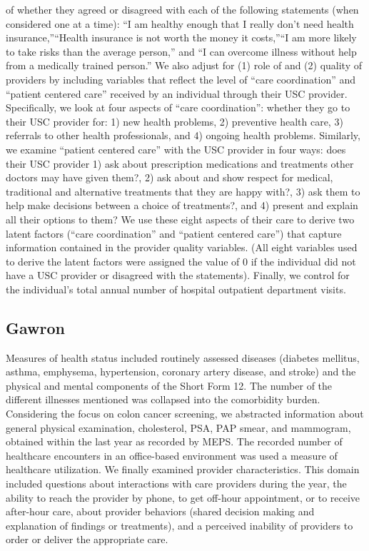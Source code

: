\documentclass[../main.tex]{subfiles}
\begin{document}
of whether they agreed or disagreed with each of the following statements (when considered one at a time): “I am healthy enough that I really don't need health insurance,”“Health insurance is not worth the money it costs,”“I am more likely to take risks than the average person,” and “I can overcome illness without help from a medically trained person.” We also adjust for (1) role of and (2) quality of providers by including variables that reflect the level of “care coordination” and “patient centered care” received by an individual through their USC provider. Specifically, we look at four aspects of “care coordination”: whether they go to their USC provider for: 1) new health problems, 2) preventive health care, 3) referrals to other health professionals, and 4) ongoing health problems. Similarly, we examine “patient centered care” with the USC provider in four ways: does their USC provider 1) ask about prescription medications and treatments other doctors may have given them?, 2) ask about and show respect for medical, traditional and alternative treatments that they are happy with?, 3) ask them to help make decisions between a choice of treatments?, and 4) present and explain all their options to them? We use these eight aspects of their care to derive two latent factors (“care coordination” and “patient centered care”) that capture information contained in the provider quality variables. (All eight variables used to derive the latent factors were assigned the value of 0 if the individual did not have a USC provider or disagreed with the statements). Finally, we control for the individual's total annual number of hospital outpatient department visits.


\subsection{Gawron}

Measures of health status included routinely assessed diseases (diabetes mellitus, asthma, emphysema, hypertension, coronary artery disease, and stroke) and the physical and mental components of the Short Form 12. The number of the different illnesses mentioned was collapsed into the comorbidity burden. Considering the focus on colon cancer screening, we abstracted information about general physical examination, cholesterol, PSA, PAP smear, and mammogram, obtained within the last year as recorded by MEPS. The recorded number of healthcare encounters in an office-based environment was used a measure of healthcare utilization. We finally examined provider characteristics. This domain included questions about interactions with care providers during the year, the ability to reach the provider by phone, to get off-hour appointment, or to receive after-hour care, about provider behaviors (shared decision making and explanation of findings or treatments), and a perceived inability of providers to order or deliver the appropriate care.
\end{document}
